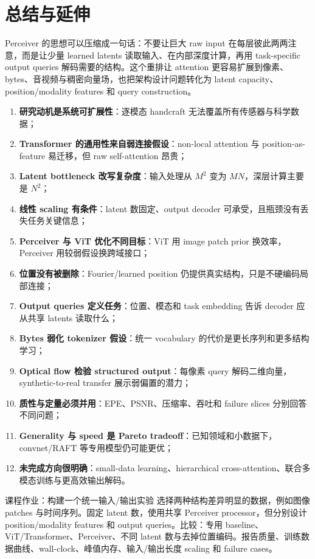 \section{总结与延伸}

Perceiver 的思想可以压缩成一句话：不要让巨大 raw input 在每层彼此两两注意，而是让少量 learned latents 读取输入、在内部深度计算，再用 task-specific output queries 解码需要的结构。这个重排让 attention 更容易扩展到像素、bytes、音视频与稠密向量场，也把架构设计问题转化为 latent capacity、position/modality features 和 query construction。

\begin{enumerate}
  \item \textbf{研究动机是系统可扩展性}：逐模态 handcraft 无法覆盖所有传感器与科学数据；
  \item \textbf{Transformer 的通用性来自弱连接假设}：non-local attention 与 position-as-feature 易迁移，但 raw self-attention 昂贵；
  \item \textbf{Latent bottleneck 改写复杂度}：输入处理从 $M^2$ 变为 $MN$，深层计算主要是 $N^2$；
  \item \textbf{线性 scaling 有条件}：latent 数固定、output decoder 可承受，且瓶颈没有丢失任务关键信息；
  \item \textbf{Perceiver 与 ViT 优化不同目标}：ViT 用 image patch prior 换效率，Perceiver 用较弱假设换跨域接口；
  \item \textbf{位置没有被删除}：Fourier/learned position 仍提供真实结构，只是不硬编码局部连接；
  \item \textbf{Output queries 定义任务}：位置、模态和 task embedding 告诉 decoder 应从共享 latents 读取什么；
  \item \textbf{Bytes 弱化 tokenizer 假设}：统一 vocabulary 的代价是更长序列和更多结构学习；
  \item \textbf{Optical flow 检验 structured output}：每像素 query 解码二维向量，synthetic-to-real transfer 展示弱偏置的潜力；
  \item \textbf{质性与定量必须并用}：EPE、PSNR、压缩率、吞吐和 failure slices 分别回答不同问题；
  \item \textbf{Generality 与 speed 是 Pareto tradeoff}：已知领域和小数据下，convnet/RAFT 等专用模型仍可能更优；
  \item \textbf{未完成方向很明确}：small-data learning、hierarchical cross-attention、联合多模态训练与更高效输出解码。
\end{enumerate}

\begin{importantbox}{课程作业：构建一个统一输入/输出实验}
选择两种结构差异明显的数据，例如图像 patches 与时间序列。固定 latent 数，使用共享 Perceiver processor，但分别设计 position/modality features 和 output queries。比较：专用 baseline、ViT/Transformer、Perceiver、不同 latent 数与去掉位置编码。报告质量、训练数据曲线、wall-clock、峰值内存、输入/输出长度 scaling 和 failure cases。
\end{importantbox}

